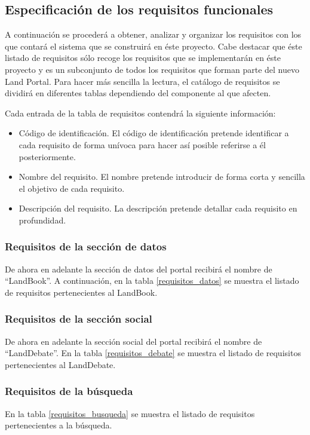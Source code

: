 \subsection{Especificación de los requisitos funcionales}
A continuación se procederá a obtener, analizar y organizar los requisitos con los que contará el sistema que se construirá en éste proyecto.  Cabe destacar que éste listado de requisitos sólo recoge los requisitos que se implementarán en éste proyecto y es un subconjunto de todos los requisitos que forman parte del nuevo Land Portal.\newline
Para hacer más sencilla la lectura, el catálogo de requisitos se dividirá en diferentes tablas dependiendo del componente al que afecten.

Cada entrada de la tabla de requisitos contendrá la siguiente información:
\begin{itemize}
\item Código de identificación. El código de identificación pretende identificar a cada requisito de forma unívoca para hacer así posible referirse a él posteriormente.
\item Nombre del requisito. El nombre pretende introducir de forma corta y sencilla el objetivo de cada requisito.
\item Descripción del requisito. La descripción pretende detallar cada requisito en profundidad.
\end{itemize}

\subsubsection{Requisitos de la sección de datos}
\label{requisitos_seccion_datos}
De ahora en adelante la sección de datos del portal recibirá el nombre de ``LandBook''.  A continuación, en la tabla  \ref{requisitos_datos} se muestra el listado de requisitos pertenecientes al LandBook.


\subsubsection{Requisitos de la sección social}
\label{requisitos_seccion_social}
De ahora en adelante la sección social del portal recibirá el nombre de ``LandDebate''.  En la tabla \ref{requisitos_debate} se muestra el listado de requisitos pertenecientes al LandDebate.


\subsubsection{Requisitos de la búsqueda}
En la tabla \ref{requisitos_busqueda} se muestra el listado de requisitos pertenecientes a la búsqueda.


